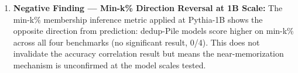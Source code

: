 \begin{enumerate}
\item \textbf{Negative Finding --- Min-k\% Direction Reversal at 1B Scale:} The min-k\% membership inference metric applied at Pythia-1B shows the opposite direction from prediction: dedup-Pile models score higher on min-k\% across all four benchmarks (no significant result, 0/4). This does not invalidate the accuracy correlation result but means the near-memorization mechanism is unconfirmed at the model scales tested.
\end{enumerate}

